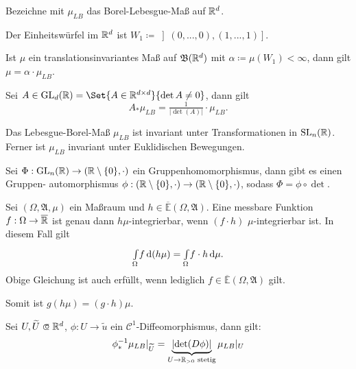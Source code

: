 \documentclass{cheat-sheet}
\newcommand{\Alg}{\mathfrak{A}} %
\newcommand{\Bor}{\mathfrak{B}} %
\newcommand{\E}{\mathbb{E}} %
\theoremstyle{definition}
\newcommand{\IntO}[2]{\Int{\Omega}{}{#1}{#2}} %
\newcommand{\IntOmu}[1]{\Int{\Omega}{}{#1}{\mu}} %
\begin{document}
\begin{nota}
  Bezeichne mit $\mu_{LB}$ das Borel-Lebesgue-Maß auf $\mathbb{R}^d$.
\end{nota}

\begin{nota}
  Der Einheitswürfel im $\mathbb{R}^d$ ist $W_1 \coloneqq \left](0, ..., 0), (1, ..., 1)\right]$.
\end{nota}

\begin{satz}
  Ist $\mu$ ein translationsinvariantes Maß auf $\Bor(\R^d)$ mit $\alpha \coloneqq \mu(W_1) < \infty$, dann gilt $\mu = \alpha \cdot \mu_{LB}$.
\end{satz}

\begin{satz}
  Sei $A \in \mathrm{GL}_d(\R) = \Set{ A \in \R^{d \times d} }{ \det A \not= 0 }$, dann gilt
  \[ A_* \mu_{LB} = \tfrac{1}{\left|\det(A)\right|} \cdot \mu_{LB}. \]
\end{satz}

\begin{satz}
  Das Lebesgue-Borel-Maß $\mu_{LB}$ ist invariant unter Transformationen in $\mathrm{SL}_n(\mathbb{R})$. Ferner ist $\mu_{LB}$ invariant unter Euklidischen Bewegungen.
\end{satz}

\begin{satz}
  Sei $\Phi : \mathrm{GL}_n(\mathbb{R}) \to (\mathbb{R} \setminus \{0\}, \cdot)$ ein Gruppenhomomorphismus, dann gibt es einen Gruppen- automorphismus $\phi : (\mathbb{R} \setminus \{0\}, \cdot) \to (\mathbb{R} \setminus \{0\}, \cdot)$, sodass $\Phi = \phi \circ \det$.
\end{satz}

\begin{satz}
  Sei $(\Omega, \Alg, \mu)$ ein Maßraum und $h \in \overline{\E}(\Omega, \Alg)$. Eine messbare Funktion $f : \Omega \to \overline{\mathbb{R}}$ ist genau dann $h\mu$-integrierbar, wenn $(f \cdot h)$ $\mu$-integrierbar ist. In diesem Fall gilt
  \[ \IntO{f}{(h \mu)} = \IntOmu{f \cdot h}. \]
  Obige Gleichung ist auch erfüllt, wenn lediglich $f \in \overline{\E}(\Omega, \Alg)$ gilt.
\end{satz}

\begin{bem}
  Somit ist $g (h \mu) = (g \cdot h) \mu$.
\end{bem}

\begin{satz}
  Sei $U, \widetilde{U} \opn \R^d$, $\phi : U \to \widetilde{u}$ ein $\mathcal{C}^1$-Diffeomorphismus, dann gilt:
    \[ \phi_*^{-1} \mu_{LB}|_{\widetilde{U}} = \underbrace{\left|\det(D \phi)\right|}_{U \to \mathbb{R}_{> 0} \text{ stetig}} \mu_{LB}|_U \]
\end{satz}
\end{document}
